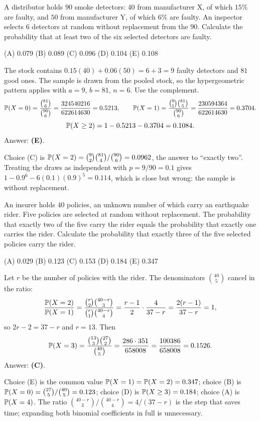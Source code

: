 \begin{example}
A distributor holds $90$ smoke detectors: $40$ from manufacturer X, of which $15\%$ are
faulty, and $50$ from manufacturer Y, of which $6\%$ are faulty. An inspector selects $6$
detectors at random without replacement from the $90$. Calculate the probability that at
least two of the six selected detectors are faulty.
\par\smallskip\noindent (A) 0.079 \quad (B) 0.089 \quad (C) 0.096 \quad (D) 0.104 \quad (E) 0.108
\end{example}
\begin{solution}
The stock contains $0.15(40) + 0.06(50) = 6 + 3 = 9$ faulty detectors and $81$ good ones.
The sample is drawn from the pooled stock, so the hypergeometric pattern applies with
$a = 9$, $b = 81$, $n = 6$. Use the complement.
\[
\mathbb{P}(X=0) = \frac{\binom{81}{6}}{\binom{90}{6}} = \frac{324540216}{622614630} = 0.5213,
\qquad
\mathbb{P}(X=1) = \frac{\binom{9}{1}\binom{81}{5}}{\binom{90}{6}} = \frac{230594364}{622614630} = 0.3704 .
\]
\[
\mathbb{P}(X\ge 2) = 1 - 0.5213 - 0.3704 = 0.1084 .
\]
Answer: \textbf{(E)}.

Choice (C) is $\mathbb{P}(X=2) = \binom{9}{2}\binom{81}{4}/\binom{90}{6} = 0.0962$, the answer
to ``exactly two''. Treating the draws as independent with $p = 9/90 = 0.1$ gives
$1 - 0.9^6 - 6(0.1)(0.9)^5 = 0.114$, which is close but wrong: the sample is without
replacement.
\end{solution}

\begin{example}
An insurer holds $40$ policies, an unknown number of which carry an earthquake rider. Five
policies are selected at random without replacement. The probability that exactly two of
the five carry the rider equals the probability that exactly one carries the rider.
Calculate the probability that exactly three of the five selected policies carry the rider.
\par\smallskip\noindent (A) 0.029 \quad (B) 0.123 \quad (C) 0.153 \quad (D) 0.184 \quad (E) 0.347
\end{example}
\begin{solution}
Let $r$ be the number of policies with the rider. The denominators $\binom{40}{5}$ cancel
in the ratio:
\[
\frac{\mathbb{P}(X=2)}{\mathbb{P}(X=1)} = \frac{\binom{r}{2}\binom{40-r}{3}}{\binom{r}{1}\binom{40-r}{4}}
= \frac{r-1}{2}\cdot\frac{4}{37-r} = \frac{2(r-1)}{37-r} = 1 ,
\]
so $2r - 2 = 37 - r$ and $r = 13$. Then
\[
\mathbb{P}(X=3) = \frac{\binom{13}{3}\binom{27}{2}}{\binom{40}{5}} = \frac{286\cdot 351}{658008}
= \frac{100386}{658008} = 0.1526 .
\]
Answer: \textbf{(C)}.

Choice (E) is the common value $\mathbb{P}(X=1) = \mathbb{P}(X=2) = 0.347$; choice (B) is
$\mathbb{P}(X=0) = \binom{27}{5}/\binom{40}{5} = 0.123$; choice (D) is $\mathbb{P}(X\ge 3) = 0.184$;
choice (A) is $\mathbb{P}(X=4)$. The ratio $\binom{40-r}{3}/\binom{40-r}{4} = 4/(37-r)$ is
the step that saves time; expanding both binomial coefficients in full is unnecessary.
\end{solution}


